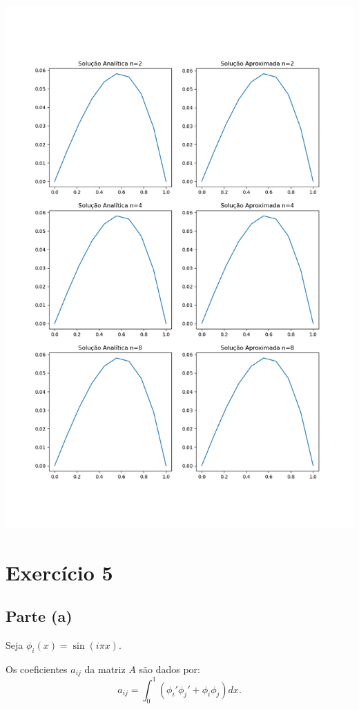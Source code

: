 \documentclass{article}
\begin{document}
\begin{center}
    \includegraphics[width=1\textwidth]{exercicio4.png}
\end{center}

\section{Exercício 5}
\subsection{Parte (a)}

Seja \( \phi_i(x) = \sin(i \pi x) \).

Os coeficientes \( a_{ij} \) da matriz \( A \) são dados por:
\[
a_{ij} = \int_0^1 \left( \phi_i' \phi_j' + \phi_i \phi_j \right) dx.
\]
\end{document}
